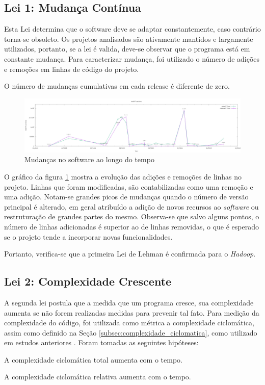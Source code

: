 \subsection{Lei 1: Mudança Contínua}
Esta Lei determina que o software deve se adaptar constantemente, caso contrário torna-se obsoleto. Os projetos analisados são ativamente mantidos e largamente utilizados, portanto, se a lei é valida, deve-se observar que o programa está em constante mudança. Para caracterizar mudança, foi utilizado o número de adições e remoções em linhas de código do projeto. 
\begin{hypothesis}
	O número de mudanças cumulativas em cada release é diferente de zero.
\end{hypothesis}
\begin{figure}[h]
	\centering
	\includegraphics[width=0.9\linewidth]{figure/Modifications}
	\caption{Mudanças no software ao longo do tempo}
	\label{fig:modifications}
\end{figure}
O gráfico da figura \ref{fig:modifications} mostra a evolução das adições e remoções de linhas no projeto. Linhas que foram modificadas, são contabilizadas como uma remoção e uma adição. Notam-se grandes picos de mudanças quando o número de versão principal é alterado, em geral atribuído a adição de novos recursos ao \textit{software} ou restruturação de grandes partes do mesmo. Observa-se que salvo alguns pontos, o número de linhas adicionadas é superior ao de linhas removidas, o que é esperado se o projeto tende a incorporar novas funcionalidades.

Portanto, verifica-se que a primeira Lei de Lehman é confirmada para o \textit{Hadoop}.

\subsection{Lei 2: Complexidade Crescente}
A segunda lei postula que a medida que um programa cresce, sua complexidade aumenta se não forem realizadas medidas para prevenir tal fato. Para medição da complexidade do código, foi utilizada como métrica a complexidade ciclomática, assim como definido na Seção \ref{subsec:complexidade_ciclomatica}, como utilizado em estudos anteriores \cite{israeli2010linux,neamtiu2013towards,skoulis2014open}.
Foram tomadas as seguintes hipóteses:
\begin{hypothesis}
	A complexidade ciclomática total aumenta com o tempo.
\end{hypothesis}
\begin{hypothesis}
	A complexidade ciclomática relativa aumenta com o tempo.
\end{hypothesis}

